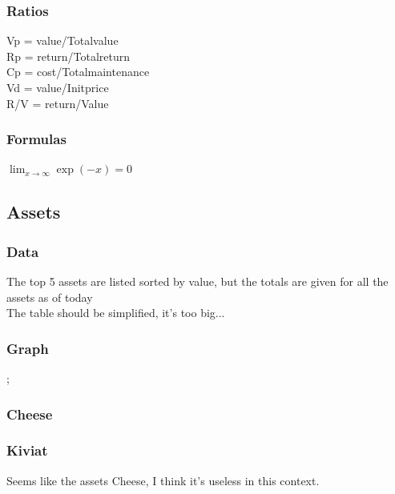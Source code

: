 \documentclass[8pt]{article} %
\begin{document}
\subsubsection{Ratios}
{\footnotesize
Vp = value/Totalvalue\\
Rp = return/Totalreturn\\
Cp = cost/Totalmaintenance\\
Vd = value/Initprice\\
R/V = return/Value\\}

\subsubsection{Formulas}

{\footnotesize
$\lim_{x \to \infty} \exp(-x) = 0$\\
}

\subsection{Assets}

\subsubsection{Data}
The top 5 assets are listed sorted by value, but the totals are given for all the assets as of today\\



The table should be simplified, it's too big...\\

\subsubsection{Graph}
;


\subsubsection{Cheese}



\subsubsection{Kiviat}


Seems like the assets Cheese, I think it's useless in this context.\\ 
\end{document}
